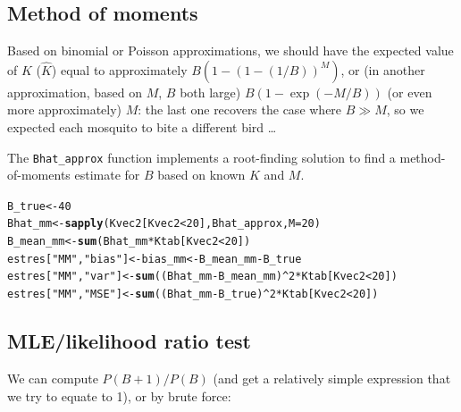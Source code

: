 \documentclass{article}\usepackage[]{graphicx}\usepackage[]{color}
\makeatletter
\newcommand{\hlnum}[1]{\textcolor[rgb]{0.686,0.059,0.569}{#1}}%
\newcommand{\hlstr}[1]{\textcolor[rgb]{0.192,0.494,0.8}{#1}}%
\newcommand{\hlopt}[1]{\textcolor[rgb]{0,0,0}{#1}}%
\newcommand{\hlstd}[1]{\textcolor[rgb]{0.345,0.345,0.345}{#1}}%
\newcommand{\hlkwb}[1]{\textcolor[rgb]{0.69,0.353,0.396}{#1}}%
\newcommand{\hlkwc}[1]{\textcolor[rgb]{0.333,0.667,0.333}{#1}}%
\newcommand{\hlkwd}[1]{\textcolor[rgb]{0.737,0.353,0.396}{\textbf{#1}}}%
\newenvironment{kframe}{%
 \def\at@end@of@kframe{}%
 \ifinner\ifhmode%
  \def\at@end@of@kframe{\end{minipage}}%
  \begin{minipage}{\columnwidth}%
 \fi\fi%
 \def\FrameCommand##1{\hskip\@totalleftmargin \hskip-\fboxsep
 \colorbox{shadecolor}{##1}\hskip-\fboxsep
     \hskip-\linewidth \hskip-\@totalleftmargin \hskip\columnwidth}%
 \MakeFramed {\advance\hsize-\width
   \@totalleftmargin\z@ \linewidth\hsize
   \@setminipage}}%
 {\par\unskip\endMakeFramed%
 \at@end@of@kframe}
\newenvironment{knitrout}{}{} %
\makeatother
\begin{document}
\subsection{Method of moments}

Based on binomial or Poisson approximations,
we should have the expected value of $K$ ($\hat K$) equal to
approximately $B(1-(1-(1/B))^M)$, or (in another approximation,
based on $M$, $B$ both large) $B(1-\exp(-M/B))$ (or even more
approximately) $M$: the last one recovers the case where $B \gg M$,
so we expected each mosquito to bite a different bird \ldots

The \verb+Bhat_approx+ function implements a root-finding
solution to find a method-of-moments estimate for $B$ based on known
$K$ and $M$.


\begin{knitrout}
\color{fgcolor}\begin{kframe}
\begin{alltt}
\hlstd{B_true} \hlkwb{<-} \hlnum{40}
\hlstd{Bhat_mm} \hlkwb{<-} \hlkwd{sapply}\hlstd{(Kvec2[Kvec2}\hlopt{<}\hlnum{20}\hlstd{],Bhat_approx,}\hlkwc{M}\hlstd{=}\hlnum{20}\hlstd{)}
\hlstd{B_mean_mm} \hlkwb{<-} \hlkwd{sum}\hlstd{(Bhat_mm}\hlopt{*}\hlstd{Ktab[Kvec2}\hlopt{<}\hlnum{20}\hlstd{])}
\hlstd{estres[}\hlstr{"MM"}\hlstd{,}\hlstr{"bias"}\hlstd{]} \hlkwb{<-} \hlstd{bias_mm} \hlkwb{<-} \hlstd{B_mean_mm} \hlopt{-}\hlstd{B_true}
\hlstd{estres[}\hlstr{"MM"}\hlstd{,}\hlstr{"var"}\hlstd{]} \hlkwb{<-} \hlkwd{sum}\hlstd{((Bhat_mm}\hlopt{-}\hlstd{B_mean_mm)}\hlopt{^}\hlnum{2}\hlopt{*}\hlstd{Ktab[Kvec2}\hlopt{<}\hlnum{20}\hlstd{])}
\hlstd{estres[}\hlstr{"MM"}\hlstd{,}\hlstr{"MSE"}\hlstd{]} \hlkwb{<-} \hlkwd{sum}\hlstd{((Bhat_mm}\hlopt{-}\hlstd{B_true)}\hlopt{^}\hlnum{2}\hlopt{*}\hlstd{Ktab[Kvec2}\hlopt{<}\hlnum{20}\hlstd{])}
\end{alltt}
\end{kframe}
\end{knitrout}

\subsection{MLE/likelihood ratio test}
We can compute $P(B+1)/P(B)$ (and get a relatively simple
expression that we try to equate to 1), or by brute force:
\end{document}
